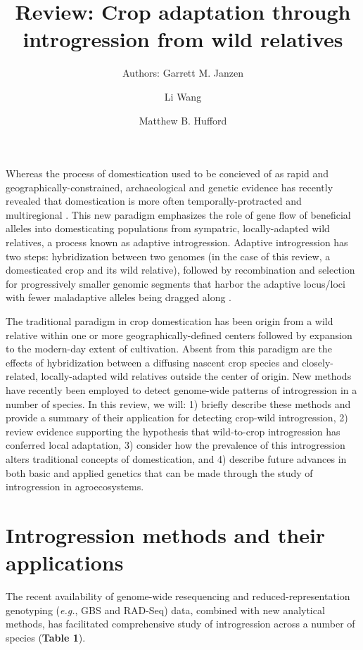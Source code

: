 \documentclass[11pt]{article}
\title{Review: Crop adaptation through introgression from wild relatives}
\author[1]{Authors: Garrett M. Janzen}%
\author[1]{Li Wang}
\author[1,*]{Matthew B. Hufford}
\affil[1]{Department of Ecology, Evolution, and Organismal Biology, Iowa State University, Ames, Iowa, USA}
\affil[*]{Correspondence: mhufford@iastate.edu (M.B. Hufford)}
\date{}
\begin{document}
\maketitle



Whereas the process of domestication used to be concieved of as rapid and geographically-constrained, archaeological and genetic evidence has recently revealed that domestication is more often temporally-protracted and multiregional \cite{brown2009complex}.
This new paradigm emphasizes the role of gene flow of beneficial alleles into domesticating populations from sympatric, locally-adapted wild relatives, a process known as adaptive introgression.
Adaptive introgression has two steps: hybridization between two genomes (in the case of this review, a domesticated crop and its wild relative), followed by recombination and selection for progressively smaller genomic segments that harbor the adaptive locus/loci with fewer maladaptive alleles being dragged along \cite{Feuillet200824}.



The traditional paradigm in crop domestication has been origin from a wild relative within one or more geographically-defined centers followed by expansion to the modern-day extent of cultivation.
Absent from this paradigm are the effects of hybridization between a diffusing nascent crop species and closely-related, locally-adapted wild relatives outside the center of origin.
New methods have recently been employed to detect genome-wide patterns of introgression in a number of species.
In this review, we will: 1) briefly describe these methods and provide a summary of their application for detecting crop-wild introgression, 2) review evidence supporting the hypothesis that wild-to-crop introgression has conferred local adaptation, 3) consider how the prevalence of this introgression alters traditional concepts of domestication, and 4) describe future advances in both basic and applied genetics that can be made through the study of introgression in agroecosystems.

\section*{Introgression methods and their applications}

The recent availability of genome-wide resequencing and reduced-representation genotyping (\emph{e.g.}, GBS and RAD-Seq) data, combined with new analytical methods, has facilitated comprehensive study of introgression across a number of species (\textbf{Table 1}).
\end{document}

